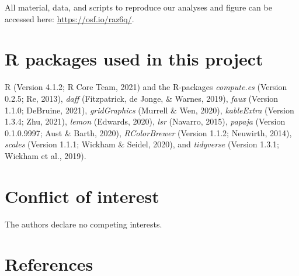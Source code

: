 \documentclass[
  english,
  man, donotrepeattitle,floatsintext]{apa7}
\begin{document}
\label{sec:sharing} All material, data, and scripts to reproduce our analyses and figure can be accessed here: \url{https://osf.io/raz6q/}.

\hypertarget{r-packages-used-in-this-project}{%
\section{R packages used in this project}\label{r-packages-used-in-this-project}}

R (Version 4.1.2; R Core Team, 2021) and the R-packages \emph{compute.es} (Version 0.2.5; Re, 2013), \emph{daff} (Fitzpatrick, de Jonge, \& Warnes, 2019), \emph{faux} (Version 1.1.0; DeBruine, 2021), \emph{gridGraphics} (Murrell \& Wen, 2020), \emph{kableExtra} (Version 1.3.4; Zhu, 2021), \emph{lemon} (Edwards, 2020), \emph{lsr} (Navarro, 2015), \emph{papaja} (Version 0.1.0.9997; Aust \& Barth, 2020), \emph{RColorBrewer} (Version 1.1.2; Neuwirth, 2014), \emph{scales} (Version 1.1.1; Wickham \& Seidel, 2020), and \emph{tidyverse} (Version 1.3.1; Wickham et al., 2019).

\hypertarget{conflict-of-interest}{%
\section{Conflict of interest}\label{conflict-of-interest}}

The authors declare no competing interests.

\hypertarget{references}{%
\section{References}\label{references}}

\begingroup
\setlength{\parindent}{-0.5in}
\setlength{\leftskip}{0.5in}

\endgroup
\end{document}
